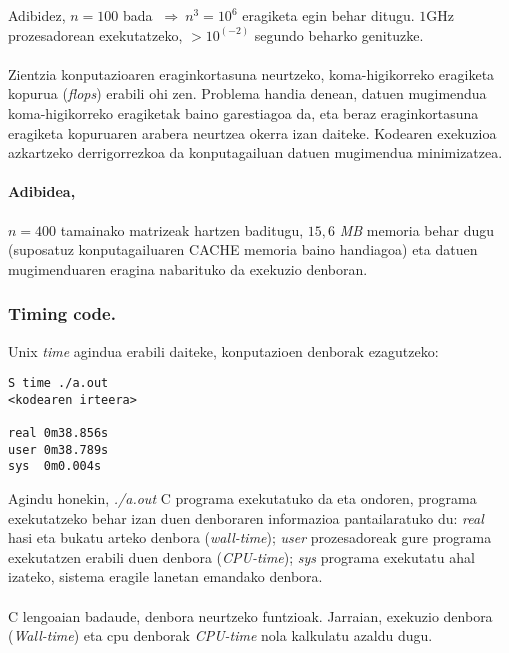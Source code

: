 Adibidez, $n=100$ bada $\ \Rightarrow \ n^3=10^{6}$ eragiketa egin behar ditugu. $1$GHz prozesadorean exekutatzeko, $>10^(-2)$ segundo beharko genituzke. 

\paragraph*{} Zientzia konputazioaren eraginkortasuna neurtzeko, koma-higikorreko eragiketa kopurua (\emph{flops}) erabili ohi zen. Problema handia denean, datuen mugimendua koma-higikorreko eragiketak baino garestiagoa da, eta beraz eraginkortasuna eragiketa kopuruaren arabera neurtzea okerra izan daiteke. Kodearen exekuzioa azkartzeko derrigorrezkoa da konputagailuan datuen mugimendua minimizatzea.

\paragraph*{\textbf{Adibidea},} $n=400$ tamainako matrizeak hartzen baditugu, $15,6$ \emph{MB} memoria behar dugu (suposatuz konputagailuaren CACHE memoria baino handiagoa) eta datuen mugimenduaren eragina nabarituko da exekuzio denboran.

\subsubsection*{Timing code.}

Unix \emph{time} agindua erabili daiteke, konputazioen denborak ezagutzeko:

\begin{lstlisting} 
S time ./a.out
<kodearen irteera>

real 0m38.856s
user 0m38.789s
sys  0m0.004s
\end{lstlisting}

Agindu honekin, \emph{./a.out} C programa exekutatuko da eta ondoren, programa exekutatzeko behar izan duen denboraren informazioa pantailaratuko du: \emph{real} hasi eta bukatu arteko denbora (\emph{wall-time}); \emph{user} prozesadoreak gure programa exekutatzen erabili duen denbora (\emph{CPU-time}); \emph{sys} programa exekutatu ahal izateko, sistema eragile lanetan emandako denbora.   

\paragraph*{} C lengoaian badaude, denbora neurtzeko funtzioak. Jarraian, exekuzio denbora (\emph{Wall-time}) eta cpu denborak \emph{CPU-time} nola kalkulatu azaldu dugu.

